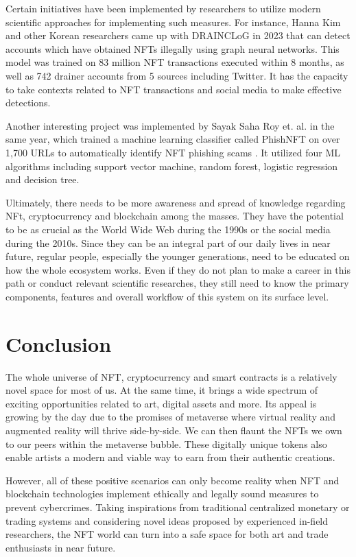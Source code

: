\documentclass[12pt]{article}
\begin{document}
Certain initiatives have been implemented by researchers to utilize modern scientific approaches for implementing such measures. For instance, Hanna Kim and other Korean researchers came up with DRAINCLoG in 2023 \cite{kim2023drainclog} that can detect accounts which have obtained NFTs illegally using graph neural networks. This model was trained on 83 million NFT transactions executed within 8 months, as well as 742 drainer accounts from 5 sources including Twitter. It has the capacity to take contexts related to NFT transactions and social media to make effective detections.

Another interesting project was implemented by Sayak Saha Roy et. al. in the same year, which trained a machine learning classifier called PhishNFT on over 1,700 URLs to automatically identify NFT phishing scams \cite{roy2023demystifying}. It utilized four ML algorithms including support vector machine, random forest, logistic regression and decision tree.

Ultimately, there needs to be more awareness and spread of knowledge regarding NFt, cryptocurrency and blockchain among the masses. They have the potential to be as crucial as the World Wide Web during the 1990s or the social media during the 2010s. Since they can be an integral part of our daily lives in near future, regular people, especially the younger generations, need to be educated on how the whole ecosystem works. Even if they do not plan to make a career in this path or conduct relevant scientific researches, they still need to know the primary components, features and overall workflow of this system on its surface level. 


\section{Conclusion}
{\color{blue} The whole universe of NFT, cryptocurrency and smart contracts is a relatively novel space for most of us. At the same time, it brings a wide spectrum of exciting opportunities related to art, digital assets and more. Its appeal is growing by the day due to the promises of metaverse where virtual reality and augmented reality will thrive side-by-side. We can then flaunt the NFTs we own to our peers within the metaverse bubble. These digitally unique tokens also enable artists a modern and viable way to earn from their authentic creations.

However, all of these positive scenarios can only become reality when NFT and blockchain technologies implement ethically and legally sound measures to prevent cybercrimes. Taking inspirations from traditional centralized monetary or trading systems and considering novel ideas proposed by experienced in-field researchers, the NFT world can turn into a safe space for both art and trade enthusiasts in near future.}



\end{document}
